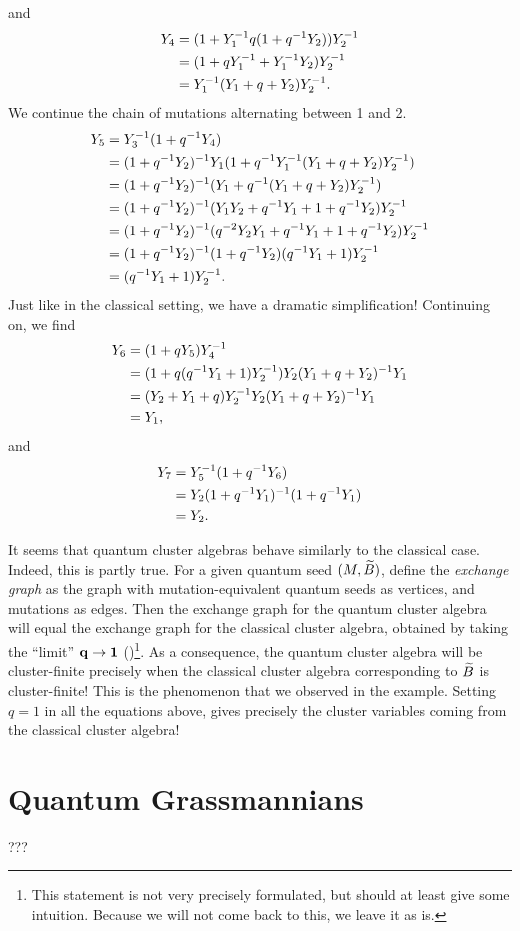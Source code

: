 and
\begin{align*}
	Y_4
	 & = (1 + Y_1 ^{-1} q (1 + q^{-1} Y_2))Y_2^{-1} \\
	 & = (1 + q Y_1^{-1} + Y_1^{-1} Y_2)Y_2^{-1}    \\
	 & = Y_1^{-1} (Y_1 + q + Y_2)Y_2^{-1}.
\end{align*}
%
We continue the chain of mutations alternating between 1 and 2.
\begin{align*}
	Y_5
	 & = Y_3^{-1} (1 + q^{-1} Y_4)                                                  \\
	 & = (1 + q^{-1} Y_2)^{-1} Y_1 (1 + q^{-1} Y_1^{-1}( Y_1 + q + Y_2)Y_2^{-1})       \\
	 & = (1 + q^{-1} Y_2)^{-1}  (Y_1 + q^{-1} ( Y_1 + q + Y_2)Y_2^{-1})               \\
	 & = (1 + q^{-1} Y_2)^{-1}  (Y_1 Y_2 + q^{-1} Y_1 + 1 + q^{-1} Y_2)Y_2^{-1}        \\
	 & = (1 + q^{-1} Y_2)^{-1}  (q^{-2} Y_2 Y_1 + q^{-1} Y_1 + 1 + q^{-1} Y_2)Y_2^{-1} \\
	 & = (1 + q^{-1} Y_2)^{-1}  (1 + q^{-1} Y_2)(q^{-1} Y_1 + 1)Y_2^{-1}               \\
	 & = (q^{-1} Y_1 + 1)Y_2^{-1}.
\end{align*}
%
Just like in the classical setting, we have a dramatic simplification! Continuing on,
we find
\begin{align*}
	Y_6
	 & = (1 + q Y_5)Y_4 ^{-1}                                      \\
	 & = (1 + q(q^{-1} Y_1 + 1)Y_2^{-1})Y_2 (Y_1 + q + Y_2)^{-1} Y_1 \\
	 & = (Y_2 +  Y_1 + q)Y_2^{-1} Y_2 (Y_1 + q + Y_2)^{-1} Y_1      \\
	 & = Y_1,
\end{align*}
%
and
\begin{align*}
	Y_7 & = Y_5^{-1} (1 + q^{-1} Y_6)                 \\
	    & = Y_2 (1 + q^{-1} Y_1)^{-1} (1 + q^{-1} Y_1) \\
	    & = Y_2.
\end{align*}
%

It seems that quantum cluster algebras behave similarly to the classical case. Indeed,
this is partly true. For a given quantum seed $(M, \widetilde{B})$, define the \emph{exchange
	graph} as the graph with mutation-equivalent quantum seeds as
vertices, and mutations as edges. Then the exchange graph for the quantum cluster
algebra will equal the exchange graph for the classical cluster algebra, obtained by
taking the ``limit'' $\mathbf{q} \to \mathbf{1}$ (\cite[Theorem
	6.1]{BerensteinZelevinsky2005QCA})\footnote{This statement is not very precisely
	formulated, but should at least give some intuition. Because we will not come back to
	this, we leave it as is.}. As a consequence, the quantum cluster algebra will be
cluster-finite precisely when the classical cluster algebra corresponding to $\widetilde{B}$ is
cluster-finite! This is the phenomenon that we observed in the example. Setting $q = 1$
in all the equations above, gives precisely the cluster variables coming from the
classical cluster algebra!

\section{Quantum Grassmannians}
???

